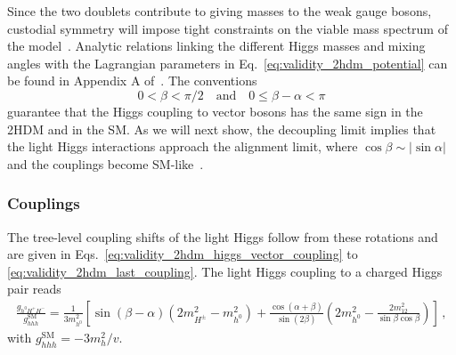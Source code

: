 Since the two doublets contribute to giving masses to the weak gauge
bosons, custodial symmetry will impose tight constraints on the viable
mass spectrum of the model~\cite{Veltman:1976rt, Toussaint:1978zm,
  Frere:1982ma, Grimus:2007if, Hollik:1986gg, Beenakker:1988pv,
  Froggatt:1991qw, He:2001tp, Grimus:2008nb}.  Analytic relations
linking the different Higgs masses and mixing angles with the
Lagrangian parameters in Eq.~\eqref{eq:validity_2hdm_potential} can be found
\eg in Appendix A of~\cite{Lopez-Val:2013yba}.  The conventions
%
\begin{equation}
  0 <\beta < \pi/2
  \quad \text{and} \quad
  0 \leq \beta-\alpha < \pi
\end{equation}
%
guarantee that the Higgs coupling to vector bosons has the same sign
in the 2HDM and in the SM.  As we will next show, the decoupling limit
implies that the light Higgs interactions approach the alignment
limit, where $\cos\beta \sim |\sin\alpha|$ and the couplings become
SM-like~\cite{Gunion:2002zf}.



\subsubsection{Couplings}

The tree-level coupling shifts of the light Higgs follow from these
rotations and are given in
Eqs.~\eqref{eq:validity_2hdm_higgs_vector_coupling} to
\eqref{eq:validity_2hdm_last_coupling}. The light Higgs
coupling to a charged Higgs pair reads
%
\begin{align}
   \frac {g_{h^0{H^+}{H^{-}}}}{g^\text{SM}_{hhh}}
  = \frac{1}{3 m_{h^0}^2}
  \left[ 
  \sin (\beta - \alpha) \left( 2 m_{H^\pm}^2 - m_{h^0}^2 \right)
  + \frac {\cos (\alpha + \beta)} {\sin (2\beta)}
  \left(2m_{h^0}^2 - \frac {2 m_{12}^2}{\sin \beta \cos \beta} \right)
  \right] \, ,
\end{align}
%
with $g^\text{SM}_{hhh} = -3 m_h^2/v$.

